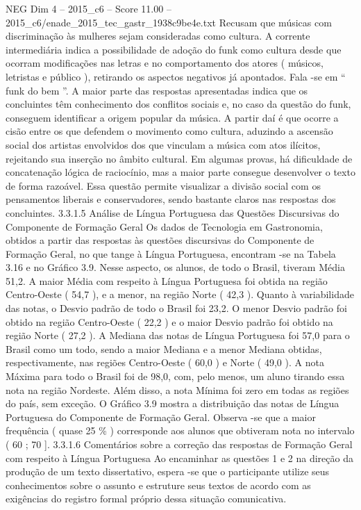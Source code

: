 \begin{textsample}{NEG Dim 4 – 2015\_c6 – Score 11.00 – 2015\_c6/enade\_2015\_tec\_gastr\_1938c9be4e.txt}
Recusam que músicas com discriminação às mulheres sejam consideradas como cultura.
A corrente intermediária indica a possibilidade de adoção do funk como cultura desde que ocorram modificações nas letras e no comportamento dos atores ( músicos, letristas e público ), retirando os aspectos negativos já apontados.
Fala -se em “ funk do bem ”.
A maior parte das respostas apresentadas indica que os concluintes têm conhecimento dos conflitos sociais e, no caso da questão do funk, conseguem identificar a origem popular da música.
A partir daí é que ocorre a cisão entre os que defendem o movimento como cultura, aduzindo a ascensão social dos artistas envolvidos dos que vinculam a música com atos ilícitos, rejeitando sua inserção no âmbito cultural.
Em algumas provas, há dificuldade de concatenação lógica de raciocínio, mas a maior parte consegue desenvolver o texto de forma razoável.
Essa questão permite visualizar a divisão social com os pensamentos liberais e conservadores, sendo bastante claros nas respostas dos concluintes. 3.3.1.5 Análise de Língua Portuguesa das Questões Discursivas do Componente de Formação Geral Os dados de Tecnologia em Gastronomia, obtidos a partir das respostas às questões discursivas do Componente de Formação Geral, no que tange à Língua Portuguesa, encontram -se na Tabela 3.16 e no Gráfico 3.9.
Nesse aspecto, os alunos, de todo o Brasil, tiveram Média 51,2.
A maior Média com respeito à Língua Portuguesa foi obtida na região Centro-Oeste ( 54,7 ), e a menor, na região Norte ( 42,3 ).
Quanto à variabilidade das notas, o Desvio padrão de todo o Brasil foi 23,2.
O menor Desvio padrão foi obtido na região Centro-Oeste ( 22,2 ) e o maior Desvio padrão foi obtido na região Norte ( 27,2 ).
A Mediana das notas de Língua Portuguesa foi 57,0 para o Brasil como um todo, sendo a maior Mediana e a menor Mediana obtidas, respectivamente, nas regiões Centro-Oeste ( 60,0 ) e Norte ( 49,0 ).
A nota Máxima para todo o Brasil foi de 98,0, com, pelo menos, um aluno tirando essa nota na região Nordeste.
Além disso, a nota Mínima foi zero em todas as regiões do país, sem exceção.
O Gráfico 3.9 mostra a distribuição das notas de Língua Portuguesa do Componente de Formação Geral.
Observa -se que a maior frequência ( quase 25 \% ) corresponde aos alunos que obtiveram nota no intervalo ( 60 ; 70 ]. 3.3.1.6 Comentários sobre a correção das respostas de Formação Geral com respeito à Língua Portuguesa Ao encaminhar as questões 1 e 2 na direção da produção de um texto dissertativo, espera -se que o participante utilize seus conhecimentos sobre o assunto e estruture seus textos de acordo com as exigências do registro formal próprio dessa situação comunicativa.

\end{textsample}
